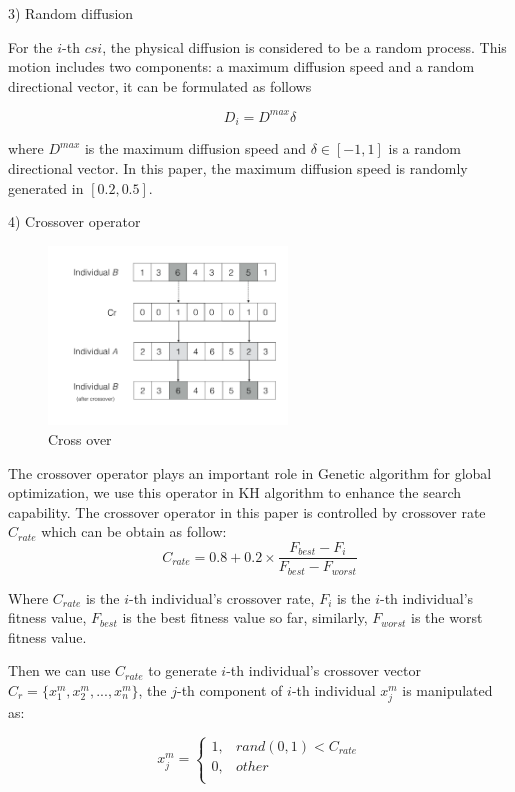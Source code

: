 \documentclass[10pt,journal,compsoc]{IEEEtran}
\begin{document}
3) Random diffusion

For the $i$-th $csi$, the physical diffusion is considered to be a random process. This motion includes two components: a maximum diffusion speed and a random directional vector, it can be formulated as follows

\begin{equation}
D_i = D^{max}\delta
\end{equation}

where $D^{max}$ is the maximum diffusion speed and $\delta \in [-1, 1]$ is a random directional vector. In this paper, the maximum diffusion speed is randomly generated in $[0.2, 0.5]$. 

4) Crossover operator

\begin{figure}[!t]
\centering
\includegraphics[width=2.5in]{./img/pic4.pdf}
\caption{Cross over}
\label{fig_opportunistic}
\end{figure}


The crossover operator plays an important role in Genetic algorithm for global optimization, we use this operator in KH algorithm to enhance the search capability. The crossover operator in this paper is controlled by crossover rate $C_{rate}$ which can be obtain as follow:
\begin{equation}
C_{rate} = 0.8 + 0.2 \times \frac{F_{best}-F_{i}}{F_{best}-F_{worst}}
\end{equation}

Where $C_{rate}$ is the $i$-th individual's crossover rate, $F_{i}$ is the $i$-th individual's fitness value, $F_{best}$ is the best fitness value so far, similarly, $F_{worst}$ is the worst fitness value.

Then we can use $C_{rate}$ to generate $i$-th individual's crossover vector $C_r = \{x_{1}^m,x_{2}^m,...,x_{n}^m\}$, the $j$-th component of $i$-th individual $x_{j}^{m}$ is manipulated as:

\begin{equation}
x_{j}^m=
\begin{cases}
1,& rand(0,1) < C_{rate}\\
0,& other\\
\end{cases}
\end{equation}
\end{document}
